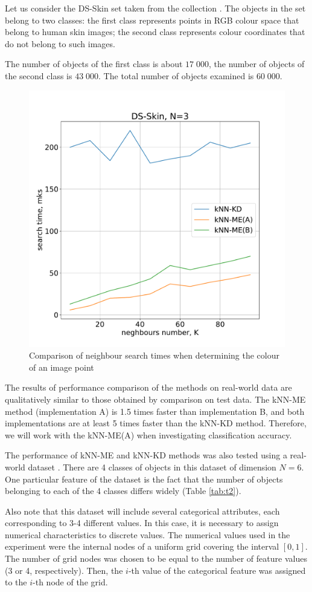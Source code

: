 \documentclass[entropy,article,submit,moreauthors,pdftex]{Definitions/mdpi}
\begin{document}
\begin{paracol}{2}
Let us consider the DS-Skin set taken from the collection \cite{ds-1}. The objects in the set belong to two classes: the first class represents points in RGB colour space that belong to human skin images; the second class represents colour coordinates that do not belong to such images.

The number of objects of the first class is about $17\;000$, the number of objects of the second class is $43\;000$. The total number of objects examined is $60\;000$.

\begin{figure}[h]
\widefigure
\includegraphics[width=0.5\linewidth]{fig6.pdf}
\caption{Comparison of neighbour search times when determining the colour of an image point\label{fig6}}
\end{figure}

The results of performance comparison of the methods on real-world data are qualitatively similar to those obtained by comparison on test data. The kNN-ME method (implementation A) is 1.5 times faster than implementation B, and both implementations are at least 5 times faster than the kNN-KD method. Therefore, we will work with the kNN-ME(A) when investigating classification accuracy.

The performance of kNN-ME and kNN-KD methods was also tested using a real-world dataset \cite{ds-2}. There are 4 classes of objects in this dataset of dimension $N = 6$. One particular feature of the dataset is the fact that the number of objects belonging to each of the 4 classes differs widely (Table \ref{tab:t2}).

\textcolor[rgb]{1,0,0}{Also note that this dataset will include several categorical attributes, each corresponding to 3-4 different values.
In this case, it is necessary to assign numerical characteristics to discrete values.
The numerical values used in the experiment were the internal nodes of a uniform grid covering the interval $[0,1]$. 
The number of grid nodes was chosen to be equal to the number of feature values (3 or 4, respectively). Then, the $i$-th value of the categorical feature was assigned to the $i$-th node of the grid.}



\end{paracol}
\end{document}
